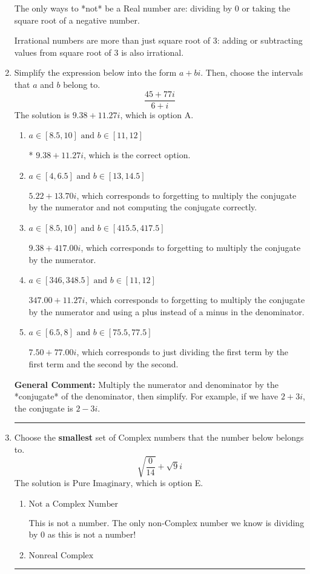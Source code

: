 \documentclass{extbook}[14pt]
\newcommand{\litem}[1]{\item #1

\rule{\textwidth}{0.4pt}}
\begin{document}
\begin{enumerate}
{ The only ways to *not* be a Real number are: dividing by 0 or taking the square root of a negative number. 
 
 Irrational numbers are more than just square root of 3: adding or subtracting values from square root of 3 is also irrational.
}
\litem{
Simplify the expression below into the form $a+bi$. Then, choose the intervals that $a$ and $b$ belong to.
\[ \frac{45 + 77 i}{6 + i} \]The solution is \( 9.38  + 11.27 i \), which is option A.\begin{enumerate}[label=\Alph*.]
\item \( a \in [8.5, 10] \text{ and } b \in [11, 12] \)

* $9.38  + 11.27 i$, which is the correct option.
\item \( a \in [4, 6.5] \text{ and } b \in [13, 14.5] \)

 $5.22  + 13.70 i$, which corresponds to forgetting to multiply the conjugate by the numerator and not computing the conjugate correctly.
\item \( a \in [8.5, 10] \text{ and } b \in [415.5, 417.5] \)

 $9.38  + 417.00 i$, which corresponds to forgetting to multiply the conjugate by the numerator.
\item \( a \in [346, 348.5] \text{ and } b \in [11, 12] \)

 $347.00  + 11.27 i$, which corresponds to forgetting to multiply the conjugate by the numerator and using a plus instead of a minus in the denominator.
\item \( a \in [6.5, 8] \text{ and } b \in [75.5, 77.5] \)

 $7.50  + 77.00 i$, which corresponds to just dividing the first term by the first term and the second by the second.
\end{enumerate}

\textbf{General Comment:} Multiply the numerator and denominator by the *conjugate* of the denominator, then simplify. For example, if we have $2+3i$, the conjugate is $2-3i$.
}
\litem{
Choose the \textbf{smallest} set of Complex numbers that the number below belongs to.
\[ \sqrt{\frac{0}{14}}+\sqrt{9}i \]The solution is \( \text{Pure Imaginary} \), which is option E.\begin{enumerate}[label=\Alph*.]
\item \( \text{Not a Complex Number} \)

This is not a number. The only non-Complex number we know is dividing by 0 as this is not a number!
\item \( \text{Nonreal Complex} \)


\end{enumerate}}
\end{enumerate}
\end{document}
